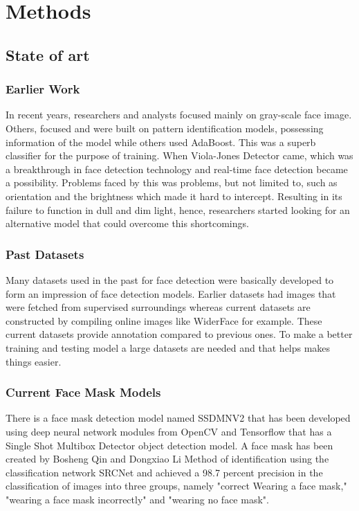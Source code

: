 \chapter{Methods}

\section{State of art}
\subsection{Earlier Work}
In recent years, researchers and analysts focused mainly on gray-scale face image. Others, focused and were built on pattern identification models, possessing information of the model while others used AdaBoost. \cite{ojala2002multiresolution} This was a superb classifier for the purpose of training. When Viola-Jones Detector came, which was a breakthrough in face detection technology and real-time face detection became a possibility. Problems faced by this was problems, but not limited to, such as orientation and the brightness which made it hard to intercept. Resulting in its failure to function in dull and dim light, hence, researchers started looking for an alternative model that could overcome this shortcomings.
\subsection{Past Datasets}
Many datasets used in the past for face detection were basically developed to form an impression of face detection models.\cite{nagrath2021ssdmnv2} Earlier datasets had images that were fetched from supervised surroundings whereas current datasets are constructed by compiling online images like WiderFace for example.\cite{yang2016wider}
These current datasets provide annotation compared to previous ones. To make a better training and testing model a large datasets are needed and that helps makes things easier.

\subsection{Current Face Mask Models}
There is a face mask detection model named SSDMNV2 that has been developed using deep neural network modules from OpenCV and Tensorflow that has a Single Shot Multibox Detector object detection model.\cite{nagrath2021ssdmnv2} 
 A face mask has been created by Bosheng Qin and Dongxiao Li 
Method of identification using the classification network SRCNet and achieved a 98.7 percent precision in the classification of images into three groups, namely "correct Wearing a face mask," "wearing a face mask incorrectly" and "wearing no face mask".\cite{qin2020identifying}

